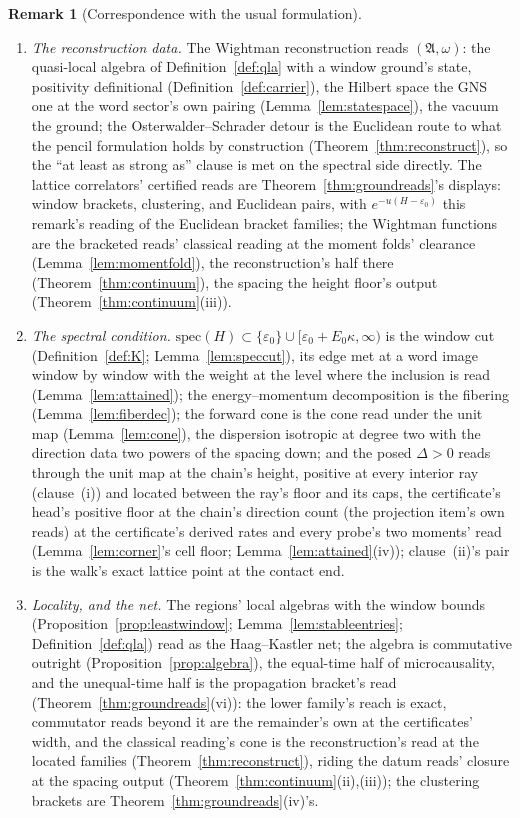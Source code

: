\documentclass[11pt]{article}
\theoremstyle{definition}
\newtheorem{remark}{Remark}
\begin{document}
\begin{remark}[Correspondence with the usual formulation]
\begin{enumerate}[leftmargin=2em,itemsep=3pt]
\item \emph{The reconstruction data.} The Wightman reconstruction
reads $(\mathfrak A,\omega)$: the quasi-local algebra of
Definition~\ref{def:qla} with a window ground's state, positivity
definitional (Definition~\ref{def:carrier}), the Hilbert space the
GNS one at the word sector's own pairing
(Lemma~\ref{lem:statespace}), the vacuum the ground; the Osterwalder--Schrader detour is
the Euclidean route to what the pencil formulation holds by
construction (Theorem~\ref{thm:reconstruct}), so the ``at least as strong as'' clause is met on the
spectral side directly. The lattice correlators' certified reads
are Theorem~\ref{thm:groundreads}'s displays: window brackets,
clustering, and Euclidean pairs, with $e^{-u(H-\varepsilon_0)}$
this remark's reading of the Euclidean bracket families; the
Wightman functions are the bracketed reads' classical reading at
the moment folds' clearance (Lemma~\ref{lem:momentfold}), the
reconstruction's half there
(Theorem~\ref{thm:continuum}), the spacing the height floor's
output (Theorem~\ref{thm:continuum}(iii)).

\item \emph{The spectral condition.} $\mathrm{spec}(H)\subset
\{\varepsilon_0\}\cup[\varepsilon_0+E_0\kappa,\infty)$ is the window cut
(Definition~\ref{def:K}; Lemma~\ref{lem:speccut}), its edge met at a
word image window by window with the weight at the level where the
inclusion is read (Lemma~\ref{lem:attained}); the
energy--momentum decomposition is the fibering
(Lemma~\ref{lem:fiberdec}); the forward cone is the cone read under
the unit map (Lemma~\ref{lem:cone}), the dispersion isotropic at
degree two with the direction data two powers of the spacing down;
and the posed $\Delta>0$ reads through the unit map at the chain's
height, positive at every interior ray (clause~(i)) and located
between the ray's floor and its caps, the certificate's head's
positive floor at the chain's direction count (the projection
item's own reads) at the certificate's derived rates and every
probe's two moments' read (Lemma~\ref{lem:corner}'s cell floor;
Lemma~\ref{lem:attained}(iv)); clause~(ii)'s pair is the walk's exact
lattice point at the contact end.

\item \emph{Locality, and the net.} The regions' local algebras
with the window bounds (Proposition~\ref{prop:leastwindow};
Lemma~\ref{lem:stableentries}; Definition~\ref{def:qla}) read as the
Haag--Kastler net; the algebra is commutative outright
(Proposition~\ref{prop:algebra}), the equal-time half of
microcausality, and the unequal-time half is the propagation
bracket's read (Theorem~\ref{thm:groundreads}(vi)): the lower
family's reach is exact, commutator reads beyond it are the
remainder's own at the certificates' width, and the classical
reading's cone is the reconstruction's read at the located
families (Theorem~\ref{thm:reconstruct}), riding
the datum reads' closure at the spacing output (Theorem~\ref{thm:continuum}(ii),(iii)); the clustering brackets are
Theorem~\ref{thm:groundreads}(iv)'s.


\end{enumerate}
\end{remark}
\end{document}
